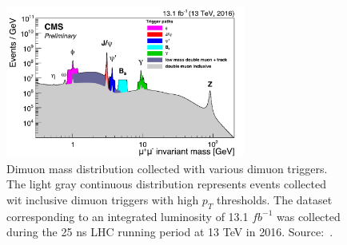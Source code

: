 \begin{figure}[htbp]
    \centering
    \includegraphics[width=0.7\textwidth]{figures_and_tables/introduction/dimuon_inv_mass.pdf}
    \caption{Dimuon mass distribution collected with various dimuon triggers. The light gray continuous distribution represents events collected wit inclusive dimuon triggers with high $p_T$ thresholds. The dataset corresponding to an integrated luminosity of 13.1 $fb^{-1}$ was collected during the 25 ns LHC  running period at 13 TeV in 2016. Source:~\cite{dimuon_inv_mass}.}
    \label{dimuon_invariant_mass}
\end{figure}

